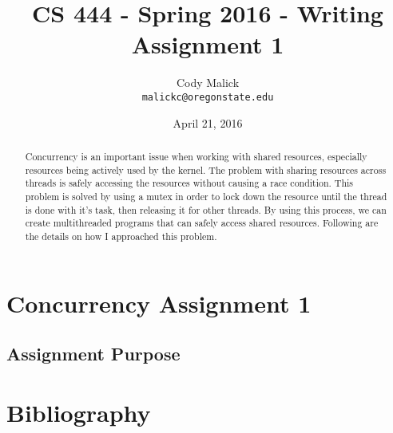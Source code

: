 \documentclass[10pt,letterpaper,onecolumn,draftclsnofoot]{IEEEtran}
\begin{document}
\begin{titlepage}
  \title{CS 444 - Spring 2016 - Writing Assignment 1}
  \author{Cody Malick\\
  \texttt{malickc@oregonstate.edu}}
  \date{April 21, 2016}
  \maketitle
  \vspace*{2cm}
  \begin{abstract}
      \noindent Concurrency is an important issue when working with shared resources,
      especially resources being actively used by the kernel.
      The problem with sharing resources across threads is safely
      accessing the resources without causing a race condition. This problem is
      solved by using a mutex in order to lock down the resource until the thread
      is done with it's task, then releasing it for other threads. By using this
      process, we can create multithreaded programs that can safely access shared
      resources. Following are the details on how I approached this problem.
  \end{abstract}

\end{titlepage}

\tableofcontents
\clearpage

\section{Concurrency Assignment 1}
  \subsection{Assignment Purpose}

\clearpage
\section{Bibliography}
\cite{johnm.2014}


\end{document}
